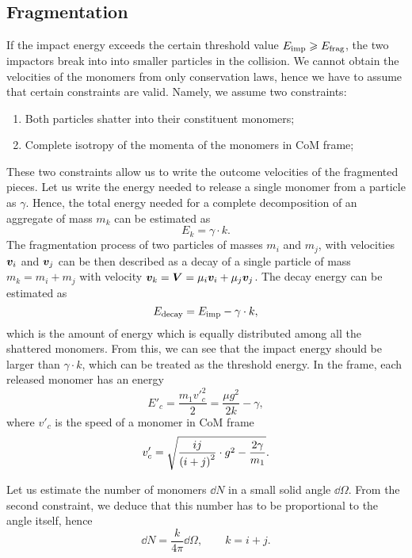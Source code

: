 \documentclass[aps,prl,preprint,groupedaddress,10pt]{revtex4-2}
\begin{document}
\subsection{Fragmentation}
If the impact energy exceeds the certain threshold value 
$E_{\mathrm{imp}}\geqslant E_{\mathrm{frag}}$, the two impactors break into into smaller
particles in the collision.
We cannot obtain the velocities of the monomers from only conservation laws, hence 
we have to assume that certain constraints are valid. Namely, we assume two 
constraints:
\begin{enumerate}
    \item Both particles shatter into their constituent monomers;
    \item Complete isotropy of the momenta of the monomers in CoM frame;
\end{enumerate}
These two constraints allow us to write the outcome velocities of the fragmented pieces.
Let us write the energy needed to release a single monomer from a particle as $\gamma$.
Hence, the total energy needed for a complete decomposition of an aggregate of mass $m_k$
can be estimated as
\begin{equation}
    E_k = \gamma\cdot k.
\end{equation}
The fragmentation process of two particles of masses $m_i$ and $m_j$, with velocities
$\vb*{v}_i$ and $\vb*{v}_j$ can be then described as a decay of a single particle of mass 
$m_k=m_i+m_j$ with velocity $\vb*{v}_k=\vb*{V}=\mu_i\vb*{v}_i+\mu_j\vb*{v}_j$. The decay energy can 
be estimated as 
\begin{equation}
    E_{\mathrm{decay}}=E_{\mathrm{imp}}-\gamma\cdot k,
\end{equation}
which is the amount of energy which is equally distributed among all the shattered 
monomers. From this, we can see that the impact energy should be larger than 
$\gamma\cdot k$, which can be treated as the threshold energy. In the  frame, each 
released monomer has an energy 
\begin{equation}
    E'_{c}=\frac{m_1v'^2_{c}}{2}=\frac{\mu g^2}{2k}-\gamma,
\end{equation}
where $v'_{c}$ is the speed of a monomer in CoM frame
\begin{equation}
    v'_{c}=\sqrt{\frac{ij}{\pqty{i+j}^2}\cdot g^2-\frac{2\gamma}{m_1}}.
\end{equation}

Let us estimate the number of monomers $\dd{N}$ in a small solid angle $\dd{\Omega}$.
From the second constraint, we deduce that this number has to be proportional to the 
angle itself, hence 
\begin{equation}
    \dd{N}=\frac{k}{4\pi}\dd{\Omega},\qquad k=i+j.
\end{equation}
\end{document}
